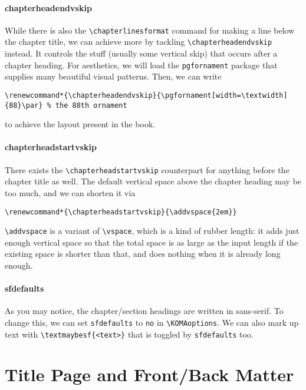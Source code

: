\paragraph{chapterheadendvskip}
While there is also the \texttt{\textbackslash chapterlinesformat} command for making a line below the chapter title, we can achieve more by tackling \texttt{\textbackslash chapterheadendvskip} instead. It controls the stuff (usually some vertical skip) that occurs after a chapter heading. For aesthetics, we will load the \texttt{pgfornament} package that supplies many beautiful visual patterns. Then, we can write
\begin{lstlisting}
\renewcommand*{\chapterheadendvskip}{\pgfornament[width=\textwidth]{88}\par} % the 88th ornament
\end{lstlisting}
to achieve the layout present in the book.

\paragraph{chapterheadstartvskip}
There exists the \texttt{\textbackslash chapterheadstartvskip} counterpart for anything before the chapter title as well. The default vertical space above the chapter heading may be too much, and we can shorten it via 
\begin{lstlisting}
\renewcommand*{\chapterheadstartvskip}{\addvspace{2em}}    
\end{lstlisting}
\texttt{\textbackslash addvspace} is a variant of \texttt{\textbackslash vspace}, which is a kind of rubber length: it adds just enough vertical space so that the total space is as large as the input length if the existing space is shorter than that, and does nothing when it is already long enough.

\paragraph{sfdefaults} As you may notice, the chapter/section headings are written in sans-serif. To change this, we can set \texttt{sfdefaults} to \texttt{no} in \texttt{\textbackslash KOMAoptions}. We can also mark up text with \texttt{\textbackslash textmaybesf\{<text>\}} that is toggled by  \texttt{sfdefaults} too.

\section{Title Page and Front/Back Matter}

